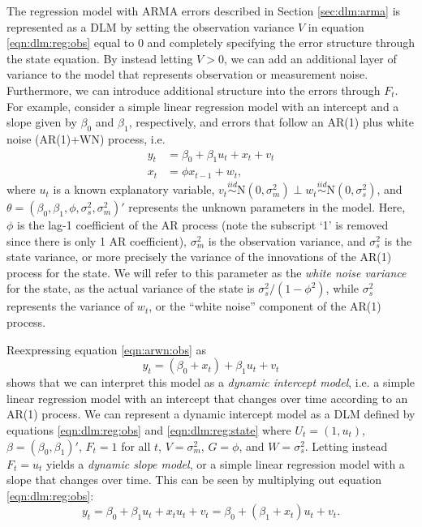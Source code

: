 The regression model with ARMA errors described in Section \ref{sec:dlm:arma} is represented as a DLM by setting the observation variance $V$ in equation \eqref{eqn:dlm:reg:obs} equal to 0 and completely specifying the error structure through the state equation. By instead letting $V > 0$, we can add an additional layer of variance to the model that represents observation or measurement noise. Furthermore, we can introduce additional structure into the errors through $F_t$. For example, consider a simple linear regression model with an intercept and a slope given by $\beta_0$ and $\beta_1$, respectively, and errors that follow an AR(1) plus white noise (AR(1)+WN) process, i.e.
\begin{align}
y_t &= \beta_0 + \beta_1u_t + x_t + v_t \label{eqn:arwn:obs} \\
x_t &= \phi x_{t-1} + w_t, \label{eqn:arwn:state}
\end{align}
where $u_t$ is a known explanatory variable, $v_t \stackrel{iid}{\sim} \mbox{N}(0, \sigma^2_m) \perp w_t \stackrel{iid}{\sim} \mbox{N}(0, \sigma^2_s)$, and $\theta = (\beta_0,\beta_1,\phi,\sigma^2_s,\sigma^2_m)'$ represents the unknown parameters in the model. Here, $\phi$ is the lag-1 coefficient of the AR process (note the subscript `1' is removed since there is only 1 AR coefficient), $\sigma^2_m$ is the observation variance, and $\sigma^2_s$ is the state variance, or more precisely the variance of the innovations of the AR(1) process for the state. We will refer to this parameter as the \emph{white noise variance} for the state, as the actual variance of the state is $\sigma^2_s / (1 - \phi^2)$, while $\sigma^2_s$ represents the variance of $w_t$, or the ``white noise'' component of the AR(1) process.

Reexpressing equation \eqref{eqn:arwn:obs} as
\begin{equation}
y_t = (\beta_0 + x_t) + \beta_1u_t + v_t \label{eqn:arwn:dynint}
\end{equation}
shows that we can interpret this model as a \emph{dynamic intercept model}, i.e. a simple linear regression model with an intercept that changes over time according to an AR(1) process. We can represent a dynamic intercept model as a DLM defined by equations \eqref{eqn:dlm:reg:obs} and \eqref{eqn:dlm:reg:state} where $U_t = (1, u_t)$, $\beta = (\beta_0, \beta_1)'$, $F_t = 1$ for all $t$, $V = \sigma^2_m$, $G = \phi$, and $W = \sigma^2_s$. Letting instead $F_t = u_t$ yields a \emph{dynamic slope model}, or a simple linear regression model with a slope that changes over time. This can be seen by multiplying out equation \eqref{eqn:dlm:reg:obs}:
\begin{equation}
y_t = \beta_0 + \beta_1u_t + x_tu_t + v_t = \beta_0 + (\beta_1 + x_t)u_t + v_t. \label{eqn:arwn:dynslo}
\end{equation}

